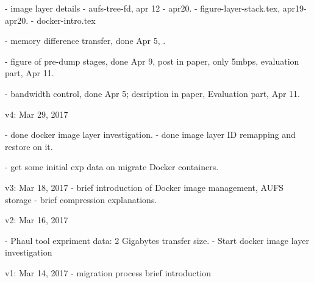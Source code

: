  - image layer details
    - aufs-tree-fd, apr 12 - apr20.
    - figure-layer-stack.tex, apr19-apr20.
    - docker-intro.tex
 
 - memory difference transfer, done Apr 5, .
 
 - figure of pre-dump stages, done Apr 9, post in paper, only 5mbps, evaluation part, Apr 11.
 
 - bandwidth control, done Apr 5; desription in paper, Evaluation part, Apr 11.

v4: Mar 29, 2017
    
    - done docker image layer investigation.
    - done image layer ID remapping and restore on it.
    
    - get some initial exp data on migrate Docker containers.
    

v3: Mar 18, 2017
    - brief introduction of Docker image management, AUFS storage
    - brief compression explanations.
    
v2: Mar 16, 2017

    - Phaul tool expriment data: 2 Gigabytes transfer size. 
    - Start docker image layer investigation

v1: Mar 14, 2017
    - migration process brief introduction


\fi

